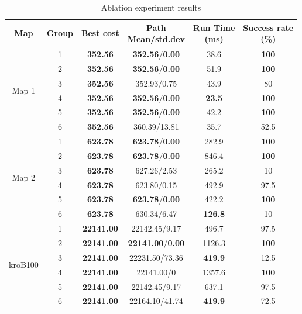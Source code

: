 \documentclass[lettersize,journal]{IEEEtran}
\begin{document}
\begin{table}[!t]
\caption{Ablation experiment results}
\label{tab:ablation}
\centering
\footnotesize
\setlength{\tabcolsep}{2.5pt}
\begin{tabular}{cccccc}
\toprule
Map & Group & Best cost & \makecell{Path\\Mean/std.dev} & \makecell{Run Time\\(ms)} & \makecell{Success rate\\(\%)} \\
\midrule
 \multirow{6}{*}{Map 1} & 1 & \textbf{352.56} & \textbf{352.56}/\textbf{0.00} & 38.6 & \textbf{100} \\
   & 2 & \textbf{352.56} & \textbf{352.56}/\textbf{0.00} & 51.9 & \textbf{100} \\
   & 3 & \textbf{352.56} & 352.93/0.75 & 43.9 & 80 \\
   & 4 & \textbf{352.56} & \textbf{352.56}/\textbf{0.00} & \textbf{23.5} & \textbf{100} \\
   & 5 & \textbf{352.56} & \textbf{352.56}/\textbf{0.00} & 42.2 & \textbf{100} \\
   & 6 & \textbf{352.56} & 360.39/13.81 & 35.7 & 52.5 \\
\midrule
 \multirow{6}{*}{Map 2} & 1 & \textbf{623.78} & \textbf{623.78}/\textbf{0.00} & 282.9 & \textbf{100} \\
   & 2 & \textbf{623.78} & \textbf{623.78}/\textbf{0.00} & 846.4 & \textbf{100} \\
   & 3 & \textbf{623.78} & 627.26/2.53 & 265.2 & 10 \\
   & 4 & \textbf{623.78} & 623.80/0.15 & 492.9 & 97.5 \\
   & 5 & \textbf{623.78} & \textbf{623.78}/\textbf{0.00} & 422.2 & \textbf{100} \\
   & 6 & \textbf{623.78} & 630.34/6.47 & \textbf{126.8} & 10 \\
\midrule
 \multirow{6}{*}{kroB100} & 1 & \textbf{22141.00} & 22142.45/9.17 & 496.7 & 97.5 \\
   & 2 & \textbf{22141.00} & \textbf{22141.00}/\textbf{0.00} & 1126.3 & \textbf{100} \\
   & 3 & \textbf{22141.00} & 22231.50/73.36 & \textbf{419.9} & 12.5 \\
   & 4 & \textbf{22141.00} & 22141.00/0 & 1357.6 & \textbf{100} \\
   & 5 & \textbf{22141.00} & 22142.45/9.17 & 637.1 & 97.5 \\
   & 6 & \textbf{22141.00} & 22164.10/41.74 & \textbf{419.9} & 72.5 \\
\bottomrule
\end{tabular}
\end{table}
\end{document}
